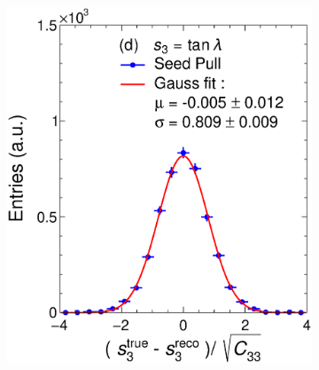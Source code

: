\begin{figure}[t]
\begin{subfigure}{0.32\textwidth}
         \caption{}
         \label{fig:resp2Seed_GArLite_Corr}
     \end{subfigure}
          \begin{subfigure}{0.32\textwidth}
         \centering
         \includegraphics[width=\textwidth]{figures/ch4-KF_NDGArLite/Toy/Corr/UnitSeed_p3.eps}
         \caption{}
         \label{fig:resp3Seed_GArLite_Corr}
     \end{subfigure}
     \begin{subfigure}{0.32\textwidth}
         \centering

\end{subfigure}
\end{figure}
